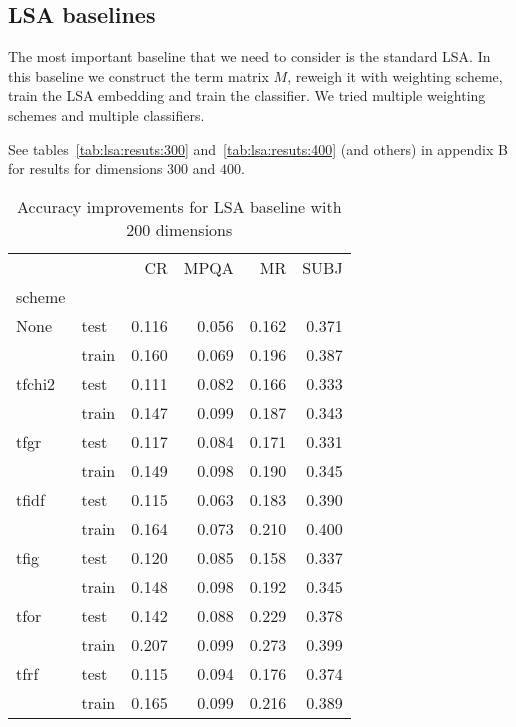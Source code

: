     \subsection{LSA baselines} \label{sec:lsa:baseline}
    The most important baseline that we need to consider is the standard LSA.
    In this baseline we construct the term matrix $M$, reweigh it with weighting scheme, train the LSA embedding and train the classifier.
    We tried multiple weighting schemes and multiple classifiers.
    
    See tables~\ref{tab:lsa:resuts:300} and~\ref{tab:lsa:resuts:400} (and others) in appendix B for results for dimensions $300$ and $400$.
    
\begin{table}[H]
\begin{center}

\begin{tabular}{llrrrr}
\toprule
{} &      &  CR &  MPQA &  MR &  SUBJ \\
scheme &  &            &              &            &              \\
\midrule
None & test &      0.116 &        0.056 &      0.162 &        0.371 \\
{} & train &      0.160 &        0.069 &      0.196 &        0.387 \\
tfchi2 & test &      0.111 &        0.082 &      0.166 &        0.333 \\
{} & train &      0.147 &        0.099 &      0.187 &        0.343 \\
tfgr & test &      0.117 &        0.084 &      0.171 &        0.331 \\
{} & train &      0.149 &        0.098 &      0.190 &        0.345 \\
tfidf & test &      0.115 &        0.063 &      0.183 &        0.390 \\
{} & train &      0.164 &        0.073 &      0.210 &        0.400 \\
tfig & test &      0.120 &        0.085 &      0.158 &        0.337 \\
{} & train &      0.148 &        0.098 &      0.192 &        0.345 \\
tfor & test &      0.142 &        0.088 &      0.229 &        0.378 \\
{} & train &      0.207 &        0.099 &      0.273 &        0.399 \\
tfrf & test &      0.115 &        0.094 &      0.176 &        0.374 \\
{} & train &      0.165 &        0.099 &      0.216 &        0.389 \\
\bottomrule
\end{tabular}

\caption[Accuracy improvements for LSA baseline with 200 dimensions]{Accuracy improvements for LSA baseline with 200 dimensions}
\label{tab:lsa:resuts:200:main}
\end{center}
\end{table}
    
